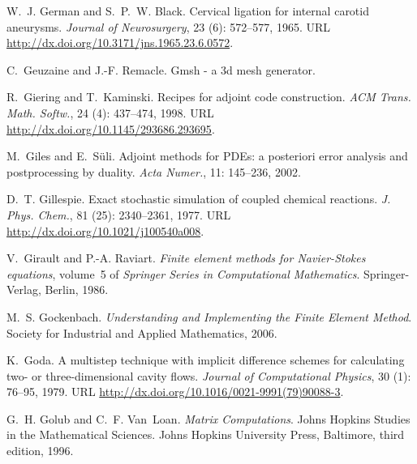 \begin{thebibliography}{467}
W.~J. German and S.~P.~W. Black.
\newblock Cervical ligation for internal carotid aneurysms.
\newblock \emph{Journal of Neurosurgery}, 23 (6): 572--577,
  1965.
\newblock URL \url{http://dx.doi.org/10.3171/jns.1965.23.6.0572}.

C.~Geuzaine and J.-F. Remacle.
\newblock Gmsh - a 3d mesh generator.

R.~Giering and T.~Kaminski.
\newblock Recipes for adjoint code construction.
\newblock \emph{ACM Trans. Math. Softw.}, 24 (4): 437--474,
  1998.
\newblock URL \url{http://dx.doi.org/10.1145/293686.293695}.

M.~Giles and E.~S{\" u}li.
\newblock Adjoint methods for {PDE}s: a posteriori error analysis and
  postprocessing by duality.
\newblock \emph{Acta Numer.}, 11: 145--236, 2002.

D.~T. Gillespie.
\newblock Exact stochastic simulation of coupled chemical reactions.
\newblock \emph{J. Phys. Chem.}, 81 (25): 2340--2361, 1977.
\newblock URL \url{http://dx.doi.org/10.1021/j100540a008}.

V.~Girault and P.-A. Raviart.
\newblock \emph{Finite element methods for {N}avier-{S}tokes equations},
  volume~5 of \emph{Springer Series in Computational Mathematics}.
\newblock Springer-Verlag, Berlin, 1986.

M.~S. Gockenbach.
\newblock \emph{Understanding and Implementing the Finite Element Method}.
\newblock Society for Industrial and Applied Mathematics, 2006.

K.~Goda.
\newblock A multistep technique with implicit difference schemes for
  calculating two- or three-dimensional cavity flows.
\newblock \emph{Journal of Computational Physics}, 30 (1):
  76--95, 1979.
\newblock URL \url{http://dx.doi.org/10.1016/0021-9991(79)90088-3}.

G.~H. Golub and C.~F. Van~Loan.
\newblock \emph{Matrix Computations}.
\newblock Johns Hopkins Studies in the Mathematical Sciences. Johns Hopkins
  University Press, Baltimore, third edition, 1996.


\end{thebibliography}
